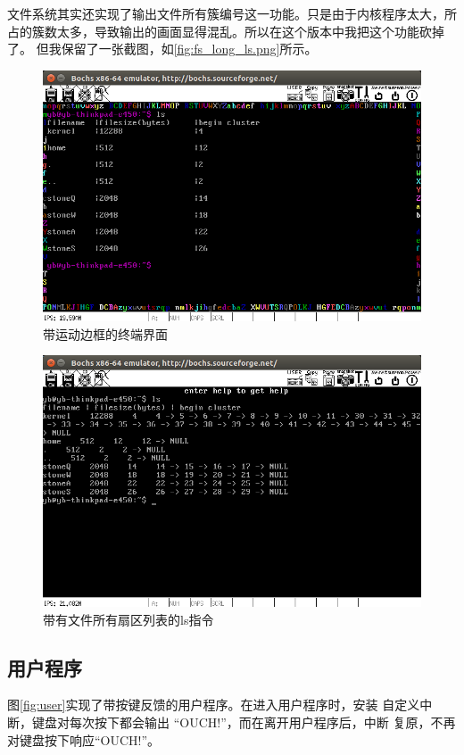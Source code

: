 \documentclass[a4paper]{article}
\begin{document}
文件系统其实还实现了输出文件所有簇编号这一功能。只是由于内核程序太大，所
占的簇数太多，导致输出的画面显得混乱。所以在这个版本中我把这个功能砍掉了。
但我保留了一张截图，如\ref{fig:fs_long_ls.png}所示。
\begin{figure}
    \begin{center}
    \includegraphics[scale=0.5]{assets/terminal.png}
    \caption{带运动边框的终端界面\label{fig:terminal}} 
    \end{center} 
\end{figure} 

\begin{figure}
    \begin{center}
    \includegraphics[scale=0.5]{assets/fs_long_ls.png}
    \caption{带有文件所有扇区列表的ls指令\label{fig:ls}} 
    \end{center} 
\end{figure} 
\subsection{用户程序}
图\ref{fig:user}实现了带按键反馈的用户程序。在进入用户程序时，安装
自定义中断，键盘对每次按下都会输出 ``OUCH!''，而在离开用户程序后，中断
复原，不再对键盘按下响应``OUCH!''。\\
\end{document}
